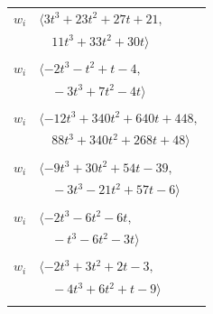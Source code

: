 \documentclass[11pt]{article}
\begin{document}
\begin{longtable}{@{}ll@{}}
$w_i$ & $\langle 3t^{3}+23t^{2}+27t+21,$\\
 & $\quad 11t^{3}+33t^{2}+30t\rangle$\\
\addlinespace[2pt]
\multicolumn{2}{@{}p{0.97\textwidth}@{}}{$i=20$, $D_i=1$, $\rho_{ij}$: $7{:}1, \allowbreak 14{:}2, \allowbreak 15{:}2, \allowbreak 21{:}2, \allowbreak 27{:}1, \allowbreak 39{:}1, \allowbreak 40{:}1, \allowbreak 45{:}1$}\\
$w_i$ & $\langle -2t^{3}-t^{2}+t-4,$\\
 & $\quad -3t^{3}+7t^{2}-4t\rangle$\\
\addlinespace[2pt]
\multicolumn{2}{@{}p{0.97\textwidth}@{}}{$i=21$, $D_i=1$, $\rho_{ij}$: $1{:}2, \allowbreak 7{:}1, \allowbreak 10{:}2, \allowbreak 11{:}1, \allowbreak 13{:}2, \allowbreak 17{:}2, \allowbreak 18{:}2, \allowbreak 20{:}1, \allowbreak 25{:}2, \allowbreak 34{:}2, \allowbreak 43{:}1, \allowbreak 44{:}1$}\\
$w_i$ & $\langle -12t^{3}+340t^{2}+640t+448,$\\
 & $\quad 88t^{3}+340t^{2}+268t+48\rangle$\\
\addlinespace[2pt]
\multicolumn{2}{@{}p{0.97\textwidth}@{}}{$i=22$, $D_i=1$, $\rho_{ij}$: $0{:}1, \allowbreak 11{:}1, \allowbreak 16{:}2, \allowbreak 25{:}1, \allowbreak 30{:}2, \allowbreak 34{:}2, \allowbreak 39{:}1, \allowbreak 40{:}2$}\\
$w_i$ & $\langle -9t^{3}+30t^{2}+54t-39,$\\
 & $\quad -3t^{3}-21t^{2}+57t-6\rangle$\\
\addlinespace[2pt]
\multicolumn{2}{@{}p{0.97\textwidth}@{}}{$i=23$, $D_i=1$, $\rho_{ij}$: $7{:}1, \allowbreak 10{:}2, \allowbreak 15{:}2, \allowbreak 19{:}2, \allowbreak 39{:}2, \allowbreak 45{:}1$}\\
$w_i$ & $\langle -2t^{3}-6t^{2}-6t,$\\
 & $\quad -t^{3}-6t^{2}-3t\rangle$\\
\addlinespace[2pt]
\multicolumn{2}{@{}p{0.97\textwidth}@{}}{$i=24$, $D_i=1$, $\rho_{ij}$: $8{:}2, \allowbreak 9{:}1, \allowbreak 13{:}2, \allowbreak 16{:}2, \allowbreak 28{:}1, \allowbreak 37{:}1$}\\
$w_i$ & $\langle -2t^{3}+3t^{2}+2t-3,$\\
 & $\quad -4t^{3}+6t^{2}+t-9\rangle$\\
\addlinespace[2pt]
\multicolumn{2}{@{}p{0.97\textwidth}@{}}{$i=25$, $D_i=1$, $\rho_{ij}$: $1{:}2, \allowbreak 4{:}2, \allowbreak 7{:}1, \allowbreak 15{:}1, \allowbreak 16{:}1, \allowbreak 21{:}1, \allowbreak 22{:}2, \allowbreak 30{:}1, \allowbreak 34{:}1, \allowbreak 37{:}1, \allowbreak 39{:}1, \allowbreak 44{:}1$}\\

\end{longtable}
\end{document}
